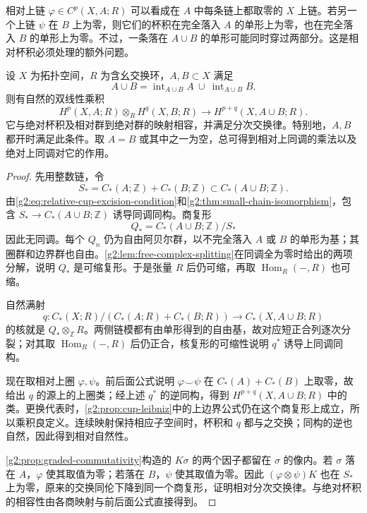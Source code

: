 相对上链 \(\varphi\in C^p(X,A;R)\) 可以看成在 \(A\) 中每条链上都取零的 \(X\) 上链。若另一个上链 \(\psi\) 在 \(B\) 上为零，则它们的杯积在完全落入 \(A\) 的单形上为零，也在完全落入 \(B\) 的单形上为零。不过，一条落在 \(A\cup B\) 的单形可能同时穿过两部分。这是相对杯积必须处理的额外问题。

\begin{proposition}\label{g2:prop:relative-cup-product}
	设 \(X\) 为拓扑空间，\(R\) 为含幺交换环，\(A,B\subset X\) 满足
	\begin{equation}\label{g2:eq:relative-cup-excision-condition}
		A\cup B
		=\operatorname{int}_{A\cup B}A\ \cup\ \operatorname{int}_{A\cup B}B.
	\end{equation}
	则有自然的双线性乘积
	\[
		H^p(X,A;R)\otimes_R H^q(X,B;R)
		\longrightarrow H^{p+q}(X,A\cup B;R).
	\]
	它与绝对杯积及相对群到绝对群的映射相容，并满足分次交换律。特别地，\(A,B\) 都开时满足此条件。取 \(A=B\) 或其中之一为空，总可得到相对上同调的乘法以及绝对上同调对它的作用。
\end{proposition}
\begin{proof}
	先用整数链，令
	\[
		S_*=C_*(A;\mathbb Z)+C_*(B;\mathbb Z)
		\subset C_*(A\cup B;\mathbb Z).
	\]
	由\eqref{g2:eq:relative-cup-excision-condition}和\cref{g2:thm:small-chain-isomorphism}，包含 \(S_*\to C_*(A\cup B;\mathbb Z)\) 诱导同调同构。商复形
	\[
		Q_*=C_*(A\cup B;\mathbb Z)/S_*
	\]
	因此无同调。每个 \(Q_n\) 仍为自由阿贝尔群，以不完全落入 \(A\) 或 \(B\) 的单形为基；其圈群和边界群也自由。\cref{g2:lem:free-complex-splitting}在同调全为零时给出的两项分解，说明 \(Q_*\) 是可缩复形。于是张量 \(R\) 后仍可缩，再取 \(\operatorname{Hom}_R(-,R)\) 也可缩。

	自然满射
	\[
		q:C_*(X;R)/(C_*(A;R)+C_*(B;R))
		\longrightarrow C_*(X,A\cup B;R)
	\]
	的核就是 \(Q_*\otimes_{\mathbb Z}R\)。两侧链模都有由单形得到的自由基，故对应短正合列逐次分裂；对其取 \(\operatorname{Hom}_R(-,R)\) 后仍正合，核复形的可缩性说明 \(q^*\) 诱导上同调同构。

	现在取相对上圈 \(\varphi,\psi\)。前后面公式说明 \(\varphi\smile\psi\) 在 \(C_*(A)+C_*(B)\) 上取零，故给出 \(q\) 的源上的上圈类；经上述 \(q^*\) 的逆同构，得到 \(H^{p+q}(X,A\cup B;R)\) 中的类。更换代表时，\cref{g2:prop:cup-leibniz}中的上边界公式仍在这个商复形上成立，所以乘积良定义。连续映射保持相应子空间时，杯积和 \(q\) 都与之交换；同构的逆也自然，因此得到相对自然性。

	\cref{g2:prop:graded-commutativity}构造的 \(K\sigma\) 的两个因子都留在 \(\sigma\) 的像内。若 \(\sigma\) 落在 \(A\)，\(\varphi\) 使其取值为零；若落在 \(B\)，\(\psi\) 使其取值为零。因此 \((\varphi\otimes\psi)K\) 也在 \(S_*\) 上为零，原来的交换同伦下降到同一个商复形，证明相对分次交换律。与绝对杯积的相容性由各商映射与前后面公式直接得到。
\end{proof}

